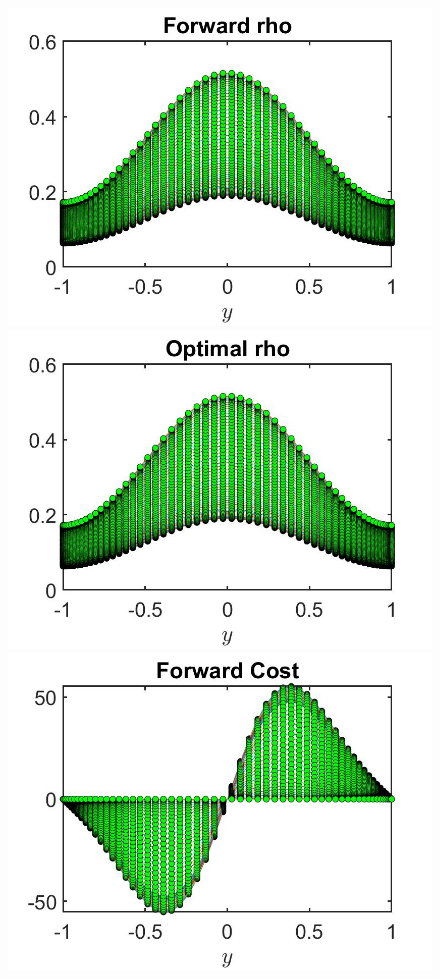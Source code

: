 \documentclass[11pt, a4paper]{article}
\theoremstyle{definition}
\begin{document}
\begin{figure}[h]
	\includegraphics[scale=0.3]{wFrhoFW1.jpg}	\includegraphics[scale=0.3]{wFrhoOpt1.jpg}
	\includegraphics[scale=0.3]{wFwFW1.jpg}

\end{figure}
\end{document}
